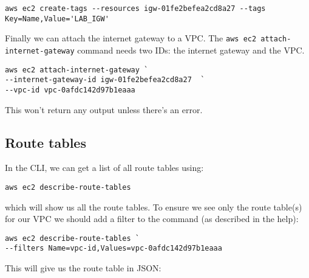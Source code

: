 \begin{verbatim}
aws ec2 create-tags --resources igw-01fe2befea2cd8a27 --tags Key=Name,Value='LAB_IGW'
\end{verbatim}

Finally we can attach the internet gateway to a VPC. The
\texttt{aws\ ec2\ attach-internet-gateway} command needs two IDs: the
internet gateway and the VPC.

\begin{verbatim}
aws ec2 attach-internet-gateway `
--internet-gateway-id igw-01fe2befea2cd8a27  `
--vpc-id vpc-0afdc142d97b1eaaa
\end{verbatim}

This won't return any output unless there's an error.

\subsection{Route tables}\label{route-tables}


In the CLI, we can get a list of all route tables using:

\begin{verbatim}
aws ec2 describe-route-tables
\end{verbatim}

which will show us all the route tables. To ensure we see only the route
table(s) for our VPC we should add a filter to the command (as described
in the help):

\begin{verbatim}
aws ec2 describe-route-tables `
--filters Name=vpc-id,Values=vpc-0afdc142d97b1eaaa
\end{verbatim}

This will give us the route table in JSON:

